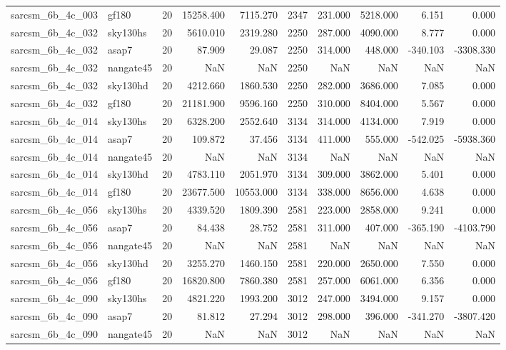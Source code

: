 \begin{tabular}{llrrrrrrrr}
sarcsm\_6b\_4c\_003 & gf180 & 20 & 15258.400 & 7115.270 & 2347 & 231.000 & 5218.000 & 6.151 & 0.000 \\
sarcsm\_6b\_4c\_032 & sky130hs & 20 & 5610.010 & 2319.280 & 2250 & 287.000 & 4090.000 & 8.777 & 0.000 \\
sarcsm\_6b\_4c\_032 & asap7 & 20 & 87.909 & 29.087 & 2250 & 314.000 & 448.000 & -340.103 & -3308.330 \\
sarcsm\_6b\_4c\_032 & nangate45 & 20 & NaN & NaN & 2250 & NaN & NaN & NaN & NaN \\
sarcsm\_6b\_4c\_032 & sky130hd & 20 & 4212.660 & 1860.530 & 2250 & 282.000 & 3686.000 & 7.085 & 0.000 \\
sarcsm\_6b\_4c\_032 & gf180 & 20 & 21181.900 & 9596.160 & 2250 & 310.000 & 8404.000 & 5.567 & 0.000 \\
sarcsm\_6b\_4c\_014 & sky130hs & 20 & 6328.200 & 2552.640 & 3134 & 314.000 & 4134.000 & 7.919 & 0.000 \\
sarcsm\_6b\_4c\_014 & asap7 & 20 & 109.872 & 37.456 & 3134 & 411.000 & 555.000 & -542.025 & -5938.360 \\
sarcsm\_6b\_4c\_014 & nangate45 & 20 & NaN & NaN & 3134 & NaN & NaN & NaN & NaN \\
sarcsm\_6b\_4c\_014 & sky130hd & 20 & 4783.110 & 2051.970 & 3134 & 309.000 & 3862.000 & 5.401 & 0.000 \\
sarcsm\_6b\_4c\_014 & gf180 & 20 & 23677.500 & 10553.000 & 3134 & 338.000 & 8656.000 & 4.638 & 0.000 \\
sarcsm\_6b\_4c\_056 & sky130hs & 20 & 4339.520 & 1809.390 & 2581 & 223.000 & 2858.000 & 9.241 & 0.000 \\
sarcsm\_6b\_4c\_056 & asap7 & 20 & 84.438 & 28.752 & 2581 & 311.000 & 407.000 & -365.190 & -4103.790 \\
sarcsm\_6b\_4c\_056 & nangate45 & 20 & NaN & NaN & 2581 & NaN & NaN & NaN & NaN \\
sarcsm\_6b\_4c\_056 & sky130hd & 20 & 3255.270 & 1460.150 & 2581 & 220.000 & 2650.000 & 7.550 & 0.000 \\
sarcsm\_6b\_4c\_056 & gf180 & 20 & 16820.800 & 7860.380 & 2581 & 257.000 & 6061.000 & 6.356 & 0.000 \\
sarcsm\_6b\_4c\_090 & sky130hs & 20 & 4821.220 & 1993.200 & 3012 & 247.000 & 3494.000 & 9.157 & 0.000 \\
sarcsm\_6b\_4c\_090 & asap7 & 20 & 81.812 & 27.294 & 3012 & 298.000 & 396.000 & -341.270 & -3807.420 \\
sarcsm\_6b\_4c\_090 & nangate45 & 20 & NaN & NaN & 3012 & NaN & NaN & NaN & NaN \\

\end{tabular}
